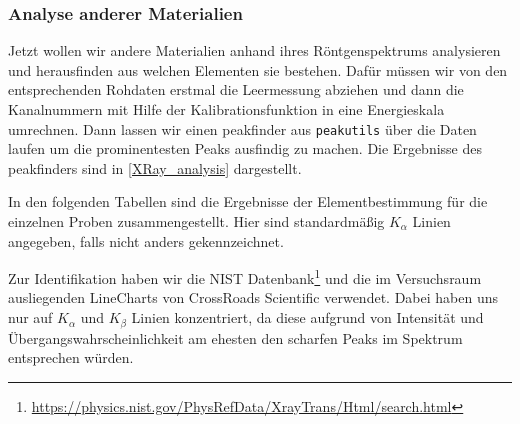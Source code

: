 \documentclass[a4paper,14pt]{article}
\newcommand{\code}[1]{\colorbox{codegray}{\texttt{#1}}}
\begin{document}
\subsubsection{Analyse anderer Materialien}
Jetzt wollen wir andere Materialien  anhand ihres Röntgenspektrums analysieren und herausfinden aus welchen Elementen sie bestehen. Dafür müssen wir von den entsprechenden Rohdaten erstmal die Leermessung abziehen und dann die Kanalnummern mit Hilfe der Kalibrationsfunktion in eine Energieskala umrechnen. Dann lassen wir einen peakfinder aus \code{peakutils} über die Daten laufen um die prominentesten Peaks ausfindig zu machen. Die Ergebnisse des peakfinders sind in \cref{XRay_analysis} dargestellt.

In den folgenden Tabellen sind die Ergebnisse der Elementbestimmung für die einzelnen Proben zusammengestellt. Hier sind standardmäßig $K_\alpha$ Linien angegeben, falls nicht anders gekennzeichnet. 

Zur Identifikation haben wir die NIST Datenbank\footnote{\url{https://physics.nist.gov/PhysRefData/XrayTrans/Html/search.html}} und die im Versuchsraum ausliegenden LineCharts von CrossRoads Scientific verwendet. Dabei haben uns nur auf $K_\alpha$ und $K_\beta$ Linien konzentriert, da diese aufgrund von Intensität und Übergangswahrscheinlichkeit am ehesten den scharfen Peaks im Spektrum entsprechen würden.
\end{document}
